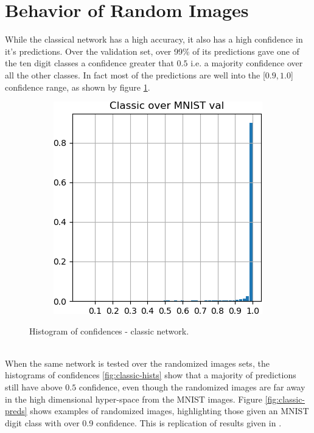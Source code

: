 \documentclass[12pt,oneside]{CUNY_PhD}
\begin{document}
\section{Behavior of Random Images}
While the classical network has a high accuracy, it also has a high confidence in it's predictions. Over the validation set, over 99\% of its predictions gave one of the ten digit classes a confidence greater that $0.5$ i.e. a majority confidence over all the other classes. In fact most of the predictions are well into the [$0.9,1.0$] confidence range, as shown by figure \ref{fig:classic-mnist}.
\begin{figure}[!htbp]
    \centering
    \begin{subfigure}[t]{0.49\textwidth}
        \includegraphics[width=\textwidth]{images/mnist-behavior/classic-hist-val.png}
    \end{subfigure}
    \caption{Histogram of confidences - classic network.}
    \label{fig:classic-mnist}
\end{figure}\\
\indent When the same network is tested over the randomized images sets, the histograms of confidences  \ref{fig:classic-hists} show that a majority of predictions still have above $0.5$ confidence, even though the randomized images are far away in the high dimensional hyper-space from the MNIST images. Figure \ref{fig:classic-preds} shows examples of randomized images, highlighting those given an MNIST digit class with over 0.9 confidence. This is replication of results given in \cite{szegedy2013intriguing}.
\end{document}

